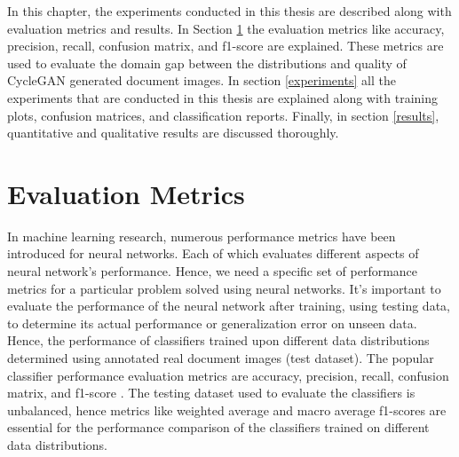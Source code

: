 \justifying
\setlength{\parskip}{1em}

In this chapter, the experiments conducted in this thesis are described along with evaluation metrics and results. In Section \ref{EvaluationMetrics} the evaluation metrics like accuracy, precision, recall, confusion matrix, and f1-score are explained. These metrics are used to evaluate the domain gap between the distributions and quality of \ac{CycleGAN} generated document images. In section \ref{experiments} all the experiments that are conducted in this thesis are explained along with training plots, confusion matrices, and classification reports. Finally, in section \ref{results}, quantitative and qualitative results are discussed thoroughly.

\section{Evaluation Metrics}\label{EvaluationMetrics}


In machine learning research, numerous performance metrics have been introduced for neural networks. Each of which evaluates different aspects of neural network's performance. Hence, we need a specific set of performance metrics for a particular problem solved using neural networks. It's important to evaluate the performance of the neural network after training, using testing data, to determine its actual performance or generalization error on unseen data. Hence, the performance of classifiers trained upon different data distributions determined using annotated real document images (test dataset). The popular classifier performance evaluation metrics are accuracy, precision, recall, confusion matrix, and f1-score \cite{powers2020evaluation}. The testing dataset used to evaluate the classifiers is unbalanced, hence metrics like weighted average and macro average f1-scores are essential for the performance comparison of the classifiers trained on different data distributions. 

